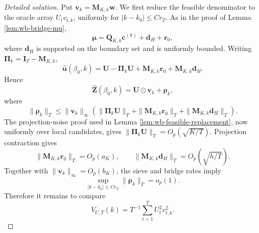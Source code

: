\documentclass[12pt]{article}
\numberwithin{equation}{section}
\theoremstyle{definition}
\begin{document}
\begin{proof}[Detailed solution]
Put \(\bm v_k=\bm M_{K,k}\bm w\).  We first reduce the feasible denominator
to the oracle array \(U_t v_{t,k}\), uniformly for
\(|k-k_0|\leq Cr_T\).  As in the proof of Lemma \ref{lem:wb-bridge-mu},
\[
    \bm\mu=\bm Q_{K,k}\bm c^{(k)}+\bm d_H+\bm r_0,
\]
where \(\bm d_H\) is supported on the boundary set and is uniformly bounded.
Writing \(\bm\Pi_k=\bm I_T-\bm M_{K,k}\),
\[
    \widehat{\bm u}(\beta_0,k)
    =\bm U-\bm\Pi_k\bm U+
      \bm M_{K,k}\bm r_0+\bm M_{K,k}\bm d_H.
\]
Hence
\[
    \widehat{\bm Z}(\beta_0,k)
    =\bm U\odot\bm v_k+\bm\rho_k,
\]
where
\[
    \|\bm\rho_k\|_T
    \leq \|\bm v_k\|_\infty
       \left(
        \|\bm\Pi_k\bm U\|_T+
        \|\bm M_{K,k}\bm r_0\|_T+
        \|\bm M_{K,k}\bm d_H\|_T
       \right).
\]
The projection-noise proof used in Lemma
\ref{lem:wb-feasible-replacement}, now uniformly over local candidates, gives
\(\|\bm\Pi_k\bm U\|_T=O_p(\sqrt{K/T})\).  Projection contraction gives
\[
    \|\bm M_{K,k}\bm r_0\|_T=O_p(a_K),
    \qquad
    \|\bm M_{K,k}\bm d_H\|_T=O_p(\sqrt{h/T}).
\]
Together with \(\|\bm v_k\|_\infty=O_p(b_K)\), the sieve and bridge rates
imply
\begin{equation}
    \sup_{|k-k_0|\leq Cr_T}\|\bm\rho_k\|_T=o_p(1).
    \label{eq:sol-rho-local}
\end{equation}
Therefore it remains to compare
\[
    V_{U,T}(k)=T^{-1}\sum_{t=1}^TU_t^2v_{t,k}^2.
\]


\end{proof}
\end{document}
